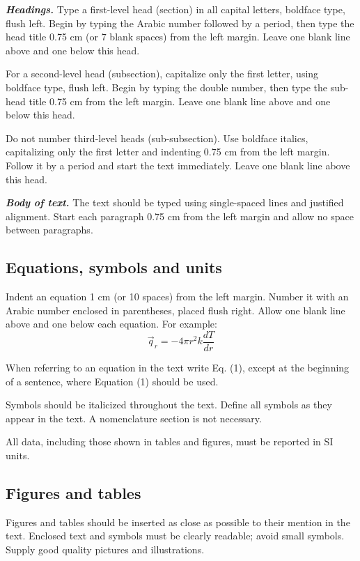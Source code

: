 \documentclass[12pt,fleqn]{article}
\begin{document}
\vspace{0.5cm} %

\textbf{\textit{Headings.}} Type a first-level head (section) in all capital letters, boldface type, flush left. Begin by typing the Arabic number followed by a period, then type the head title 0.75 cm (or 7 blank spaces) from the left margin. Leave one blank line above and one below this head. 

For a second-level head (subsection), capitalize only the first letter, using boldface type, flush left. Begin by typing the double number, then type the sub-head title 0.75 cm from the left margin. Leave one blank line above and one below this head. 

Do not number third-level heads (sub-subsection). Use boldface italics, capitalizing only the first letter and indenting 0.75 cm from the left margin. Follow it by a period and start the text immediately. Leave one blank line above this head.

\vspace{0.5cm} %
% 
\textbf{\textit{Body of text.}} The text should be typed using single-spaced lines and justified alignment. Start each paragraph 0.75 cm from the left margin and allow no space between paragraphs.

\subsection{Equations, symbols and units}
Indent an equation 1 cm (or 10 spaces) from the left margin. Number it with an Arabic number enclosed in parentheses, placed flush right. Allow one blank line above and one below each equation. For example:
\begin{equation}
\vec{q}_{r}=-4\pi r^{2}k\frac{dT}{dr}
\label{eq1}
\end{equation}

When referring to an equation in the text write Eq. (1), except at the beginning of a sentence, where Equation (1) should be used. 

Symbols should be italicized throughout the text. Define all symbols as they appear in the text. A nomenclature section is not necessary.

All data, including those shown in tables and figures, must be reported in SI units. 

\subsection{Figures and tables}
Figures and tables should be inserted as close as possible to their mention in the text. Enclosed text and symbols must be clearly readable; avoid small symbols. Supply good quality pictures and illustrations.
\end{document}
